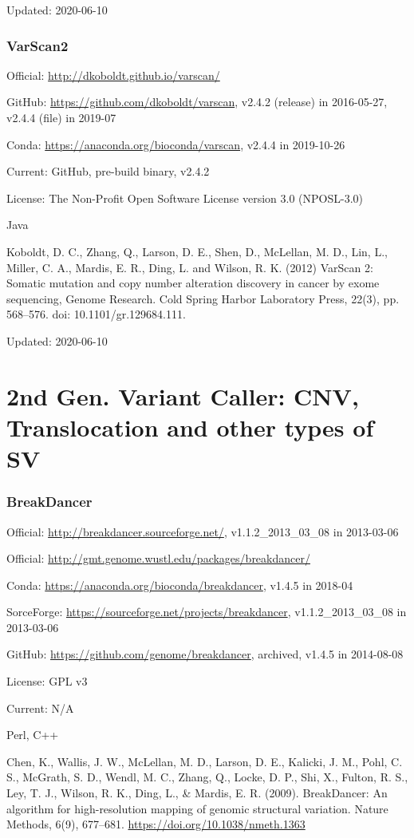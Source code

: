 \documentclass[]{article}
\begin{document}
Updated: 2020-06-10

\section{VarScan2}

Official: \url{http://dkoboldt.github.io/varscan/}

GitHub: \url{https://github.com/dkoboldt/varscan}, v2.4.2 (release) in 2016-05-27, v2.4.4 (file) in 2019-07

Conda: \url{https://anaconda.org/bioconda/varscan}, v2.4.4 in 2019-10-26

Current: GitHub, pre-build binary, v2.4.2

License: The Non-Profit Open Software License version 3.0 (NPOSL-3.0)

Java

Koboldt, D. C., Zhang, Q., Larson, D. E., Shen, D., McLellan, M. D., Lin, L., Miller, C. A., Mardis, E. R., Ding, L. and Wilson, R. K. (2012) VarScan 2: Somatic mutation and copy number alteration discovery in cancer by exome sequencing, Genome Research. Cold Spring Harbor Laboratory Press, 22(3), pp. 568–576. doi: 10.1101/gr.129684.111.

Updated: 2020-06-10
\part{2nd Gen. Variant Caller: CNV, Translocation and other types of SV}
\section{BreakDancer}

Official: \url{http://breakdancer.sourceforge.net/}, v1.1.2\_2013\_03\_08 in 2013-03-06

Official: \url{http://gmt.genome.wustl.edu/packages/breakdancer/}

Conda: \url{https://anaconda.org/bioconda/breakdancer}, v1.4.5 in 2018-04

SorceForge: \url{https://sourceforge.net/projects/breakdancer}, v1.1.2\_2013\_03\_08 in 2013-03-06

GitHub: \url{https://github.com/genome/breakdancer}, archived, v1.4.5 in 2014-08-08

License: GPL v3

Current: N/A

Perl, C++

Chen, K., Wallis, J. W., McLellan, M. D., Larson, D. E., Kalicki, J. M., Pohl, C. S., McGrath, S. D., Wendl, M. C., Zhang, Q., Locke, D. P., Shi, X., Fulton, R. S., Ley, T. J., Wilson, R. K., Ding, L., \& Mardis, E. R. (2009). BreakDancer: An algorithm for high-resolution mapping of genomic structural variation. Nature Methods, 6(9), 677–681. \url{https://doi.org/10.1038/nmeth.1363}
\end{document}
